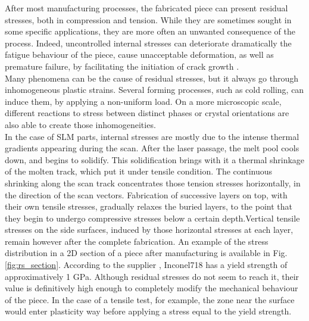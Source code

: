 After most manufacturing processes, the fabricated piece can present residual stresses, both in compression and tension. While they are sometimes sought in some specific applications, they are more often an unwanted consequence of the process. Indeed, uncontrolled internal stresses can deteriorate dramatically the fatigue behaviour of the piece, cause unacceptable deformation, as well as premature failure, by facilitating the initiation of crack growth \cite{Vrancken2016}.\\

Many phenomena can be the cause of residual stresses, but it always go through inhomogeneous plastic strains. Several forming processes, such as cold rolling, can induce them, by applying a non-uniform load. On a more microscopic scale, different reactions to stress between distinct phases or crystal orientations are also able to create those inhomogeneities.\\

In the case of SLM parts, internal stresses are mostly due to the intense thermal gradients appearing during the scan. After the laser passage, the melt pool cools down, and begins to solidify. This solidification brings with it a thermal shrinkage of the molten track, which put it under tensile condition. The continuous shrinking along the scan track concentrates those tension stresses horizontally, in the direction of the scan vectors. Fabrication of successive layers on top, with their own tensile stresses, gradually relaxes the buried layers, to the point that they begin to undergo compressive stresses below a certain depth.Vertical tensile stresses on the side surfaces, induced by those horizontal stresses at each layer, remain however after the complete fabrication. An example of the stress distribution in a 2D section of a piece after manufacturing is available in Fig. \ref{fig:rs_section}. According to the supplier \cite{Inconel}, Inconel718 has a yield strength of approximatively 1 GPa. Although residual stresses do not seem to reach it, their value is definitively high enough to completely modify the mechanical behaviour of the piece. In the case of a tensile test, for example, the zone near the surface would enter plasticity way before applying a stress equal to the yield strength. \\

